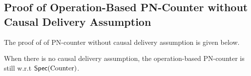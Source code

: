 




\subsection{Proof of Operation-Based PN-Counter without Causal Delivery Assumption}
\label{subsec:proof of operation-based PN-counter without causal delivery assumption}

The proof of \crdtlin{} of PN-counter without causal delivery assumption is given below. %

\begin{lemma}
\label{lemma:when there is no causal delivery assumption, the operation-based PN-counter is still correct}
When there is no causal delivery assumption, the operation-based PN-counter is still \crdtlinearizable{} w.r.t $\mathsf{Spec}(\text{Counter})$.
\end{lemma}

